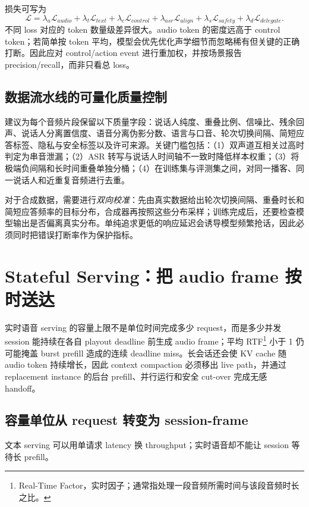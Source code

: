 \documentclass[UTF8,fontset=none,a4paper,10pt]{ctexart}
\begin{document}
损失可写为
\begin{equation}
\mathcal L=\lambda_a\mathcal L_{audio}+\lambda_t\mathcal L_{text}+\lambda_c\mathcal L_{control}
+\lambda_{asr}\mathcal L_{align}+\lambda_s\mathcal L_{safety}+\lambda_d\mathcal L_{delegate}.
\end{equation}
不同 loss 对应的 token 数量级差异很大。audio token 的密度远高于 control token；若简单按 token 平均，模型会优先优化声学细节而忽略稀有但关键的正确打断。因此应对 control/action event 进行重加权，并按场景报告 precision/recall，而非只看总 loss。

\subsection{数据流水线的可量化质量控制}

建议为每个音频片段保留以下质量字段：说话人纯度、重叠比例、信噪比、残余回声、说话人分离置信度、语音分离伪影分数、语言与口音、轮次切换间隔、简短应答标签、隐私与安全标签以及许可来源。关键门槛包括：（1）双声道互相关过高时判定为串音泄漏；（2）ASR 转写与说话人时间轴不一致时降低样本权重；（3）将极端负间隔和长时间重叠单独分桶；（4）在训练集与评测集之间，对同一播客、同一说话人和近重复音频进行去重。

对于合成数据，需要进行\emph{双向校准}：先由真实数据给出轮次切换间隔、重叠时长和简短应答频率的目标分布，合成器再按照这些分布采样；训练完成后，还要检查模型输出是否偏离真实分布。单纯追求更低的响应延迟会诱导模型频繁抢话，因此必须同时把错误打断率作为保护指标。

\section{Stateful Serving：把 audio frame 按时送达}

实时语音 serving 的容量上限不是单位时间完成多少 request，而是多少并发 session 能持续在各自 playout deadline 前生成 audio frame；平均 RTF\footnote{Real-Time Factor，实时因子；通常指处理一段音频所需时间与该段音频时长之比。} 小于 1 仍可能掩盖 burst prefill 造成的连续 deadline miss。长会话还会使 KV cache 随 audio token 持续增长，因此 context compaction 必须移出 live path，并通过 replacement instance 的后台 prefill、并行运行和安全 cut-over 完成无感 handoff。

\subsection{容量单位从 request 转变为 session-frame}

文本 serving 可以用单请求 latency 换 throughput；实时语音却不能让 session 等待长 prefill。
\end{document}
